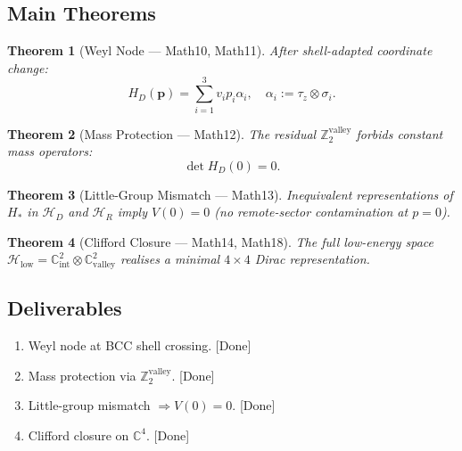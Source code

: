 \documentclass[11pt,a4paper]{article}
\newtheorem{theorem}{Theorem}[section]
\begin{document}
\subsection{Main Theorems}
\begin{theorem}[Weyl Node --- Math10, Math11]
After shell-adapted coordinate change:
\begin{equation}
H_{D}(\mathbf{p})=\sum_{i=1}^{3}v_{i}p_{i}\alpha_{i},
\quad\alpha_{i}:=\tau_{z}\otimes\sigma_{i}.
\end{equation}
\end{theorem}

\begin{theorem}[Mass Protection --- Math12]
The residual $\mathbb{Z}_{2}^{\mathrm{valley}}$ forbids constant mass operators:
\begin{equation}
\det H_{D}(0)=0.
\end{equation}
\end{theorem}

\begin{theorem}[Little-Group Mismatch --- Math13]
Inequivalent representations of $H_{*}$ in $\mathcal{H}_{D}$ and $\mathcal{H}_{R}$
imply $V(0)=0$ (no remote-sector contamination at $p=0$).
\end{theorem}

\begin{theorem}[Clifford Closure --- Math14, Math18]
The full low-energy space
$\mathcal{H}_{\mathrm{low}}=\mathbb{C}^{2}_{\mathrm{int}}\otimes\mathbb{C}^{2}_{\mathrm{valley}}$
realises a minimal $4\times4$ Dirac representation.
\end{theorem}

\subsection{Deliverables}
\begin{enumerate}
\item Weyl node at BCC shell crossing. \hfill\textcolor{green!55!black}{[Done]}
\item Mass protection via $\mathbb{Z}_{2}^{\mathrm{valley}}$. \hfill\textcolor{green!55!black}{[Done]}
\item Little-group mismatch $\Rightarrow V(0)=0$. \hfill\textcolor{green!55!black}{[Done]}
\item Clifford closure on $\mathbb{C}^{4}$. \hfill\textcolor{green!55!black}{[Done]}
\end{enumerate}

\end{document}
